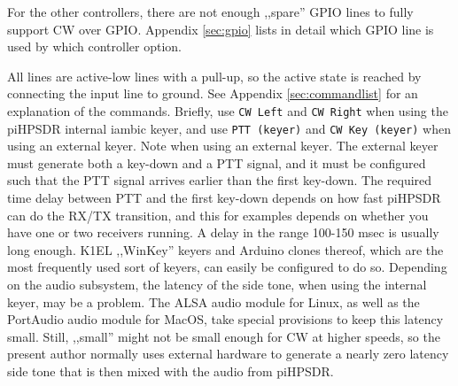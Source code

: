 \documentclass[12pt]{book}
\def\bltt#1{\texttt{\color{blue}#1}}
\def\pH{pi\-HPSDR\xspace}
\begin{document}
For the other controllers, there are not enough ,,spare'' GPIO lines to fully
support CW over GPIO. Appendix \ref{sec:gpio} lists in detail which GPIO line
is used by which controller option.

All lines are active-low lines with a pull-up, so the active state is reached
by connecting the input line to ground. See Appendix \ref{sec:commandlist} for
an explanation of the commands. Briefly, use \bltt{CW Left} and \bltt{CW Right}
when using the \pH internal iambic keyer, and use \bltt{PTT (keyer)} and
\bltt{CW Key (keyer)} when using an external keyer. Note when using an external
keyer. The external keyer must generate both a key-down and a PTT signal, and it must be configured
such that the PTT signal arrives earlier than the first key-down. The required time
delay between PTT and the first key-down depends  on how fast \pH can do the
RX/TX transition, and this for examples depends on whether you have one or two receivers
running. A delay in the range 100-150 msec is usually long enough.
K1EL ,,WinKey'' keyers and Arduino clones thereof, which are the most frequently
used sort
of keyers, can easily be configured to do so. Depending on the audio subsystem,
the latency of the side tone, when using the internal keyer, may be a problem.
The ALSA audio module for Linux, as well as the PortAudio audio  module for MacOS,
 take special provisions to keep this latency small. Still, ,,small'' might not
 be small enough for CW at higher speeds, so the present author normally uses
 external hardware to generate a nearly zero latency side tone that is then
 mixed with the audio from \pH.
\end{document}
